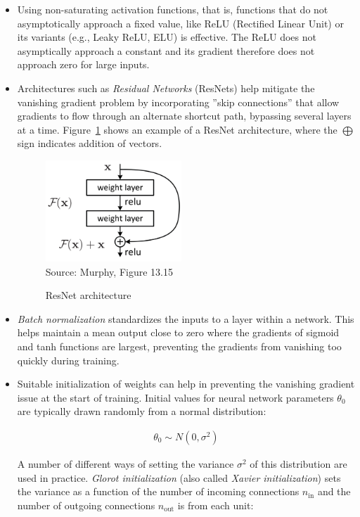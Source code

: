 \begin{itemize}
\item Using non-saturating activation functions, that is, functions that do not asymptotically approach a fixed value, like ReLU (Rectified Linear Unit) or its variants (e.g., Leaky ReLU, ELU) is effective. The ReLU does not asymptically approach a constant and its gradient therefore does not approach zero for large inputs. 

\item Architectures such as \emph{Residual Networks} (ResNets) help mitigate the vanishing gradient problem by incorporating ''skip connections'' that allow gradients to flow through an alternate shortcut path, bypassing several layers at a time. Figure~\ref{fig:resnet} shows an example of a ResNet architecture, where the $\bigoplus$ sign indicates addition of vectors. 

\begin{figure}
\centering
\includegraphics[height=1.5in]{screen8.png} \\

\scriptsize Source: Murphy, Figure 13.15
\caption{ResNet architecture}
\label{fig:resnet}
\end{figure}

\item \emph{Batch normalization} standardizes the inputs to a layer within a network. This helps maintain a mean output close to zero where the gradients of sigmoid and tanh functions are largest, preventing the gradients from vanishing too quickly during training.

\item Suitable initialization of weights can help in preventing the vanishing gradient issue at the start of training. Initial values for neural network parameters $\theta_0$ are typically drawn randomly from a normal distribution:

\begin{align*}
\theta_0 \sim N(0, \sigma^2)
\end{align*}

A number of different ways of setting the variance $\sigma^2$ of this distribution are used in practice. \emph{Glorot initialization} (also called \emph{Xavier initialization}) sets the variance as a function of the number of incoming connections $n_{\text{in}}$ and the number of outgoing connections $n_{\text{out}}$ is from each unit:


\end{itemize}
